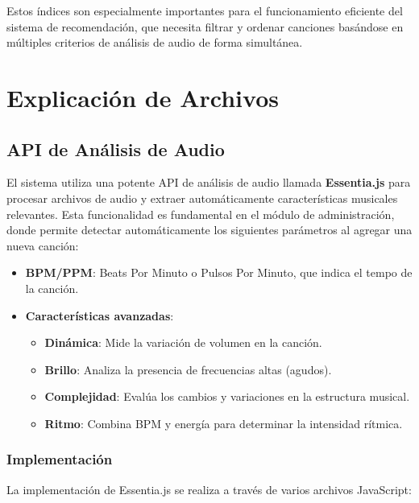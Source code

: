 \documentclass[a4paper,12pt]{article}
\begin{document}
Estos índices son especialmente importantes para el funcionamiento eficiente del sistema de recomendación, que necesita filtrar y ordenar canciones basándose en múltiples criterios de análisis de audio de forma simultánea.

\section{Explicación de Archivos}
\subsection{API de Análisis de Audio}

El sistema utiliza una potente API de análisis de audio llamada \textbf{Essentia.js} para procesar archivos de audio y extraer automáticamente características musicales relevantes. Esta funcionalidad es fundamental en el módulo de administración, donde permite detectar automáticamente los siguientes parámetros al agregar una nueva canción:

\begin{itemize}
    \item \textbf{BPM/PPM}: Beats Por Minuto o Pulsos Por Minuto, que indica el tempo de la canción.
    \item \textbf{Características avanzadas}:
    \begin{itemize}
        \item \textbf{Dinámica}: Mide la variación de volumen en la canción.
        \item \textbf{Brillo}: Analiza la presencia de frecuencias altas (agudos).
        \item \textbf{Complejidad}: Evalúa los cambios y variaciones en la estructura musical.
        \item \textbf{Ritmo}: Combina BPM y energía para determinar la intensidad rítmica.
    \end{itemize}
\end{itemize}

\subsubsection{Implementación}

La implementación de Essentia.js se realiza a través de varios archivos JavaScript:
\end{document}
